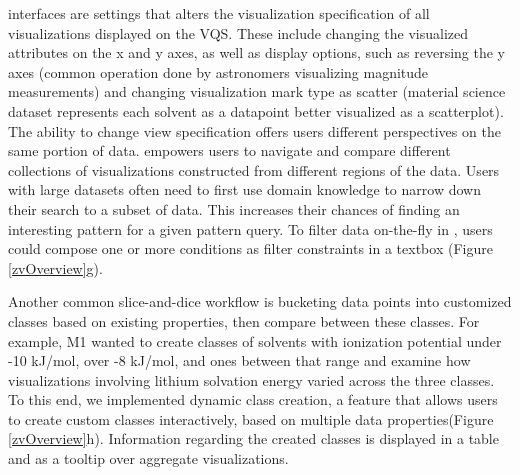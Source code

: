  interfaces are settings that alters the visualization specification of all visualizations displayed on the VQS. These include changing the visualized attributes on the x and y axes, as well as display options, such as reversing the y axes (common operation done by astronomers visualizing magnitude measurements) and changing visualization mark type as scatter (material science dataset represents each solvent as a datapoint better visualized as a scatterplot). The ability to change view specification offers users different perspectives on the same portion of data.
 empowers users to navigate and compare different collections of visualizations constructed from  different regions of the data. Users with large datasets often need to first use domain knowledge to narrow down their search to a subset of data. This increases their chances of finding an interesting pattern for a given pattern query. To filter data on-the-fly in \zv, users could compose one or more conditions as filter constraints in a textbox (Figure \ref{zvOverview}g). 
\par Another common slice-and-dice workflow is bucketing data points into customized classes based on existing properties, then compare between these classes. For example, M1 wanted to create classes of solvents with ionization potential under -10 kJ/mol, over -8 kJ/mol, and ones between that range and examine how visualizations involving lithium solvation energy varied across the three classes. To this end, we implemented dynamic class creation, a feature that allows users to create custom classes interactively, based on multiple data properties(Figure \ref{zvOverview}h). Information regarding the created classes is displayed in a table and as a tooltip over aggregate visualizations.
%
